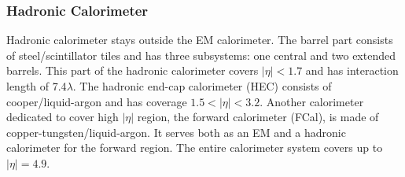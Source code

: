 \subsubsection{Hadronic Calorimeter}

Hadronic calorimeter stays outside the EM calorimeter. The barrel part consists of steel/scintillator tiles and has three subsystems: one central and two extended barrels. This part of the hadronic calorimeter covers $|\eta|<1.7$ and has interaction length of 7.4$\lambda$. The hadronic end-cap calorimeter (HEC) consists of cooper/liquid-argon and has coverage $1.5<|\eta|<3.2$. Another calorimeter dedicated to cover high $|\eta|$ region, the forward calorimeter (FCal), is made of copper-tungsten/liquid-argon. It serves both as an EM and a hadronic calorimeter for the forward region. The entire calorimeter system covers up to $|\eta|=4.9$.




